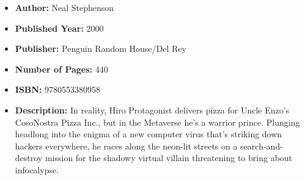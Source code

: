 \documentclass{tufte-handout}
\begin{document}
\begin{itemize}
    \item[] \textbf{Author:} Neal Stephenson
    \item[] \textbf{Published Year:} 2000
    \item[] \textbf{Publisher:} Penguin Random House/Del Rey
    \item[] \textbf{Number of Pages:} 440      
    \item[] \textbf{ISBN:} 9780553380958
    \item[] \textbf{Description:} In reality, Hiro Protagonist delivers pizza for Uncle Enzo’s CosoNostra Pizza Inc., but in the Metaverse he’s a warrior prince. Plunging headlong into the enigma of a new computer virus that’s striking down hackers everywhere, he races along the neon-lit streets on a search-and-destroy mission for the shadowy virtual villain threatening to bring about infocalypse.
\end{itemize}
\end{document}
